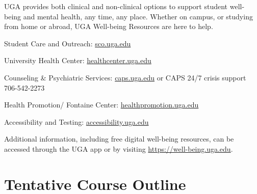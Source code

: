 \documentclass[12pt]{article}
\begin{document}
UGA provides both clinical and non-clinical options to support student
well-being and mental health, any time, any place. Whether on campus,
or studying from home or abroad, UGA Well-being Resources are here to
help. 


Student Care and Outreach: \url{sco.uga.edu}

University Health Center: \url{healthcenter.uga.edu}

Counseling \& Psychiatric Services: \url{caps.uga.edu} or CAPS 24/7
crisis support 706-542-2273 

Health Promotion/ Fontaine Center: \url{healthpromotion.uga.edu}

Accessibility and Testing: \url{accessibility.uga.edu}

Additional information, including free digital well-being resources,
can be accessed through the UGA app or by visiting
\url{https://well-being.uga.edu}. 

\clearpage

\section*{\normalsize Tentative Course Outline}
\vspace{-6mm}
\end{document}
